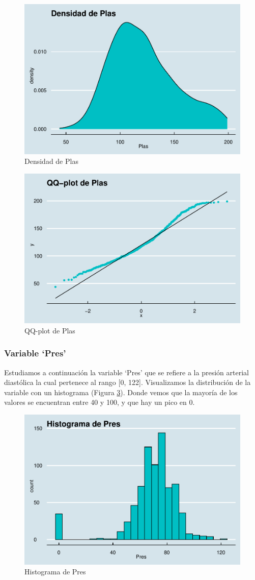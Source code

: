 \documentclass[
]{article}
\begin{document}
\begin{figure}

{\centering \includegraphics[width=0.5\linewidth]{pima-clasificacion_files/figure-latex/densidad_plas-1} 

}

\caption{Densidad de Plas}\label{fig:densidad_plas}
\end{figure}

\begin{figure}

{\centering \includegraphics[width=0.5\linewidth]{pima-clasificacion_files/figure-latex/qq_plas-1} 

}

\caption{QQ-plot de Plas}\label{fig:qq_plas}
\end{figure}

\hypertarget{variable-pres}{%
\subsubsection{Variable `Pres'}\label{variable-pres}}

Estudiamos a continuación la variable `Pres' que se refiere a la presión
arterial diastólica la cual pertenece al rango {[}0, 122{]}.
Visualizamos la distribución de la variable con un histograma (Figura
\ref{fig:hist_pres}). Donde vemos que la mayoría de los valores se
encuentran entre 40 y 100, y que hay un pico en 0.

\begin{figure}

{\centering \includegraphics[width=0.5\linewidth]{pima-clasificacion_files/figure-latex/hist_pres-1} 

}

\caption{Histograma de Pres}\label{fig:hist_pres}
\end{figure}
\end{document}

